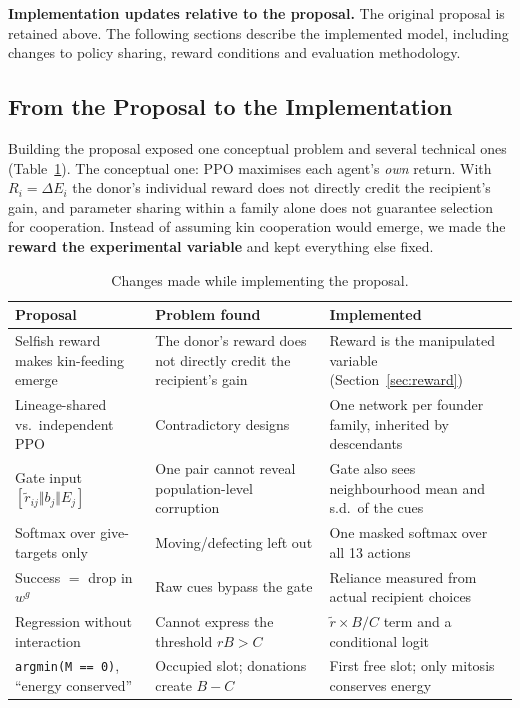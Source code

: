 \documentclass{article}
\begin{document}
\textbf{Implementation updates relative to the proposal.} The original proposal is retained above. The following sections describe the implemented model, including changes to policy sharing, reward conditions and evaluation methodology.

\subsection{From the Proposal to the Implementation}
Building the proposal exposed one conceptual problem and several technical ones (Table~\ref{tab:fixes}). The conceptual one: PPO maximises each agent's \emph{own} return. With $R_i=\Delta E_i$ the donor's individual reward does not directly credit the recipient's gain, and parameter sharing within a family alone does not guarantee selection for cooperation. Instead of assuming kin cooperation would emerge, we made the \textbf{reward the experimental variable} and kept everything else fixed.

\begin{table}[!htbp]
\centering
\caption{Changes made while implementing the proposal.}
\label{tab:fixes}
\small
\begin{tabular}{p{}p{}p{}}
\toprule
\textbf{Proposal} & \textbf{Problem found} & \textbf{Implemented} \\
\midrule
Selfish reward makes kin-feeding emerge & The donor's reward does not directly credit the recipient's gain & Reward is the manipulated variable (Section~\ref{sec:reward}) \\
Lineage-shared vs.\ independent PPO & Contradictory designs & One network per founder family, inherited by descendants \\
Gate input $[\tilde r_{ij}\Vert b_j\Vert E_j]$ & One pair cannot reveal population-level corruption & Gate also sees neighbourhood mean and s.d.\ of the cues \\
Softmax over give-targets only & Moving/defecting left out & One masked softmax over all 13 actions \\
Success $=$ drop in $w^g$ & Raw cues bypass the gate & Reliance measured from actual recipient choices \\
Regression without interaction & Cannot express the threshold $rB>C$ & $\tilde r\times B/C$ term and a conditional logit \\
\texttt{argmin(M == 0)}, ``energy conserved'' & Occupied slot; donations create $B-C$ & First free slot; only mitosis conserves energy \\
\bottomrule
\end{tabular}
\end{table}
\end{document}
